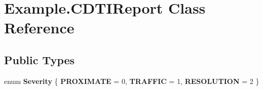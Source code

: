 \hypertarget{class_example_1_1_c_d_t_i_report}{}\section{Example.\+C\+D\+T\+I\+Report Class Reference}
\label{class_example_1_1_c_d_t_i_report}


 


\subsection*{Public Types}
\begin{DoxyCompactItemize}
\item 
\hypertarget{class_example_1_1_c_d_t_i_report_a2e9a6b1d49e40e4ef91e4f51f7cb56be}{}enum {\bfseries Severity} \{ {\bfseries P\+R\+O\+X\+I\+M\+A\+T\+E} = 0, 
{\bfseries T\+R\+A\+F\+F\+I\+C} = 1, 
{\bfseries R\+E\+S\+O\+L\+U\+T\+I\+O\+N} = 2
 \}\label{class_example_1_1_c_d_t_i_report_a2e9a6b1d49e40e4ef91e4f51f7cb56be}

\end{DoxyCompactItemize}
